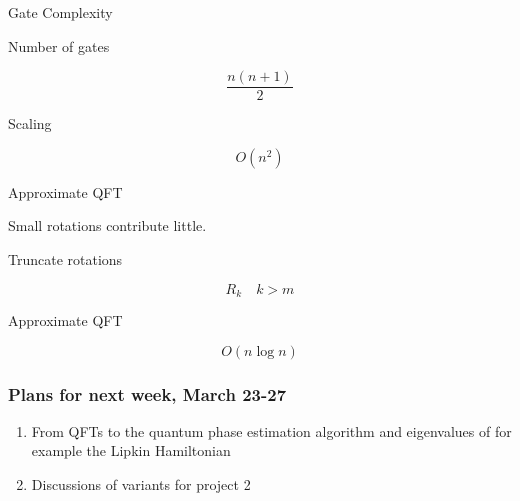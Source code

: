 \documentclass{beamer}
\begin{document}

\begin{frame}{Gate Complexity}

Number of gates

\[
\frac{n(n+1)}{2}
\]

Scaling

\[
O(n^2)
\]

\end{frame}


\begin{frame}{Approximate QFT}

Small rotations contribute little.

Truncate rotations

\[
R_k \quad k>m
\]


Approximate QFT

\[
O(n\log n)
\]

\end{frame}

\begin{frame}
\frametitle{Plans for next week, March 23-27}

\begin{enumerate}
\item From QFTs to the quantum phase estimation algorithm and eigenvalues of for example the Lipkin  Hamiltonian

\item Discussions of variants for project 2
\end{enumerate}

\noindent
\end{frame}
\end{document}
